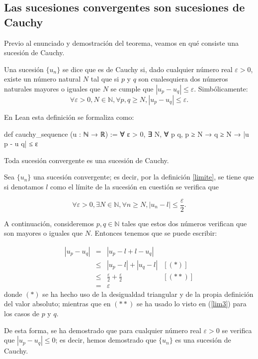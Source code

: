 \subsection{Las sucesiones convergentes son sucesiones de Cauchy}

Previo al enunciado y demostración del teorema, veamos en qué consiste
una sucesión de Cauchy.

\begin{definicion}
  Una sucesión \(\{u_n\}\) se dice que es de Cauchy si, dado cualquier
  número real \(ε > 0\), existe un número natural \(N\) tal que si \(p\)
  y \(q\) son cualesquiera dos números naturales mayores o iguales que
  \(N\) se cumple que \(|u_p - u_q| ≤ ε\). Simbólicamente:
  \begin{equation}
  ∀ ε > 0, N ∈ ℕ, ∀ p, q ≥ N, |u_p - u_q| ≤ ε.
  \end{equation}
\end{definicion}

En Lean esta definición se formaliza como:
\begin{leancode}
def cauchy_sequence (u : ℕ → ℝ) :=
∀ ε > 0, ∃ N, ∀ p q, p ≥ N → q ≥ N → |u p - u q| ≤ ε
\end{leancode}

\begin{teorema}
  Toda sucesión convergente es una sucesión de Cauchy.
\end{teorema}
\begin{demostracion}
  Sea \(\{u_n\}\) una sucesión convergente; es decir, por la definición
  \ref{limite}, se tiene que si denotamos \(l\) como el límite de la
  sucesión en cuestión se verifica que

  \begin{equation}\label{lim3}
  ∀ ε > 0, ∃ N ∈ ℕ, ∀ n ≥ N, |u_n-l| ≤ \frac{ε}{2}.
  \end{equation}

  A continuación, consideremos \(p,q ∈ ℕ\) tales que estos dos números
  verifican que son mayores o iguales que \(N\). Entonces tenemos que se
  puede escribir:

  \[\begin{array}{llll}
      |u_p-u_q| &= &|u_p-l+l-u_q|           & \\
                &≤ &|u_p-l|+|u_q-l|         & [(*)] \\
                &≤ &\frac{ε}{2}+\frac{ε}{2} & [(**)] \\
                &= &ε
  \end{array}\]
  donde \((*)\) se ha hecho uso de la desigualdad triangular y de la
  propia definición del valor absoluto; mientras que en \((**)\) se ha
  usado lo visto en (\ref{lim3}) para los casos de \(p\) y \(q\).

  De esta forma, se ha demostrado que para cualquier número real \(ε > 0\)
  se verifica que \(|u_p - u_q| ≤ 0\); es decir, hemos demostrado
  que \(\{u_n\}\) es una sucesión de Cauchy.
\end{demostracion}

